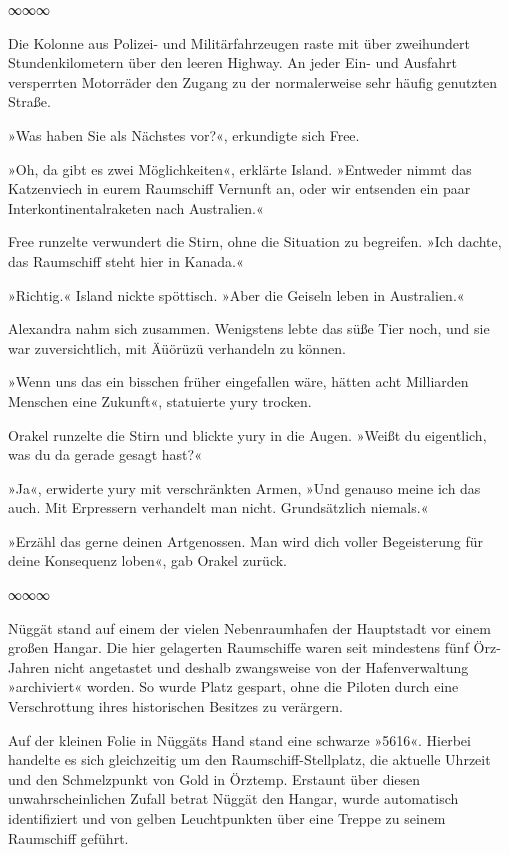\begin{center}
∞∞∞
\end{center}

Die Kolonne aus Polizei- und Militärfahrzeugen raste mit über zweihundert Stundenkilometern über den leeren Highway. An jeder Ein- und Ausfahrt versperrten Motorräder den Zugang zu der normalerweise sehr häufig genutzten Straße.

»Was haben Sie als Nächstes vor?«, erkundigte sich Free.

»Oh, da gibt es zwei Möglichkeiten«, erklärte Island. »Entweder nimmt das Katzenviech in eurem Raumschiff Vernunft an, oder wir entsenden ein paar Interkontinentalraketen nach Australien.«

Free runzelte verwundert die Stirn, ohne die Situation zu begreifen. »Ich dachte, das Raumschiff steht hier in Kanada.«

»Richtig.« Island nickte spöttisch. »Aber die Geiseln leben in Australien.«

Alexandra nahm sich zusammen. Wenigstens lebte das süße Tier noch, und sie war zuversichtlich, mit Äüörüzü verhandeln zu können.

»Wenn uns das ein bisschen früher eingefallen wäre, hätten acht Milliarden Menschen eine Zukunft«, statuierte yury trocken.

Orakel runzelte die Stirn und blickte yury in die Augen. »Weißt du eigentlich, was du da gerade gesagt hast?«

»Ja«, erwiderte yury mit verschränkten Armen, »Und genauso meine ich das auch. Mit Erpressern verhandelt man nicht. Grundsätzlich niemals.«

»Erzähl das gerne deinen Artgenossen. Man wird dich voller Begeisterung für deine Konsequenz loben«, gab Orakel zurück.

\begin{center}
∞∞∞
\end{center}

Nüggät stand auf einem der vielen Nebenraumhafen der Hauptstadt vor einem großen Hangar. Die hier gelagerten Raumschiffe waren seit mindestens fünf Örz-Jahren nicht angetastet und deshalb zwangsweise von der Hafenverwaltung »archiviert« worden. So wurde Platz gespart, ohne die Piloten durch eine Verschrottung ihres historischen Besitzes zu verärgern.

Auf der kleinen Folie in Nüggäts Hand stand eine schwarze »5616«. Hierbei handelte es sich gleichzeitig um den Raumschiff-Stellplatz, die aktuelle Uhrzeit und den Schmelzpunkt von Gold in Örztemp. Erstaunt über diesen unwahrscheinlichen Zufall betrat Nüggät den Hangar, wurde automatisch identifiziert und von gelben Leuchtpunkten über eine Treppe zu seinem Raumschiff geführt.

